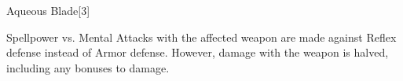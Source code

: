 \begin{spellsection}{Aqueous Blade}[3]
    \begin{spellheader}
    \end{spellheader}
    \begin{spellcontent}
        \begin{spelltargetinginfo}
        \end{spelltargetinginfo}
        \begin{spelleffects}
            \begin{spellattack}{Spellpower vs. Mental}
                \spellsuccess Attacks with the affected weapon are made against Reflex defense instead of Armor defense. However, damage with the weapon is halved, including any bonuses to damage.
            \end{spellattack}
            \spelldur \durshort
        \end{spelleffects}
    \end{spellcontent}
    \begin{spellfooter}
        \miscastrandom
    \end{spellfooter}
    \begin{spellaugments}
    \end{spellaugments}
\end{spellsection}

